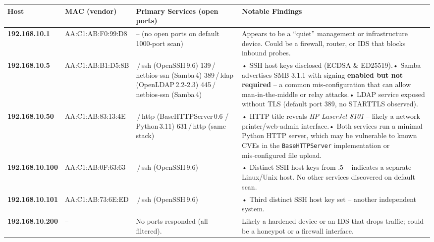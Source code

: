 \begin{longtable}[]{@{}
  >{\raggedright\arraybackslash}p{}
  >{\raggedright\arraybackslash}p{}
  >{\raggedright\arraybackslash}p{}
  >{\raggedright\arraybackslash}p{}@{}}
\toprule\noalign{}
\begin{minipage}[b]{\linewidth}\raggedright
Host
\end{minipage} & \begin{minipage}[b]{\linewidth}\raggedright
MAC (vendor)
\end{minipage} & \begin{minipage}[b]{\linewidth}\raggedright
Primary Services (open ports)
\end{minipage} & \begin{minipage}[b]{\linewidth}\raggedright
Notable Findings
\end{minipage} \\
\midrule\noalign{}
\endhead
\bottomrule\noalign{}
\endlastfoot
\textbf{192.168.10.1} & AA:C1:AB:F0:99:D8 & -- (no open ports on default
1000‑port scan) & Appears to be a ``quiet'' management or infrastructure
device. Could be a firewall, router, or IDS that blocks inbound
probes. \\
\textbf{192.168.10.5} & AA:C1:AB:B1:D5:8B & 22\,/\,ssh (OpenSSH\,9.6)
139\,/\,netbios‑ssn (Samba\,4) 389\,/\,ldap (OpenLDAP\,2.2‑2.3)
445\,/\,netbios‑ssn (Samba\,4) & • SSH host keys disclosed (ECDSA \&
ED25519).• Samba advertises SMB 3.1.1 with signing \textbf{enabled but
not required} -- a common mis‑configuration that can allow
man‑in‑the‑middle or relay attacks.• LDAP service exposed without TLS
(default port 389, no STARTTLS observed). \\
\textbf{192.168.10.50} & AA:C1:AB:83:13:4E & 80\,/\,http
(BaseHTTPServer\,0.6 / Python\,3.11) 631\,/\,http (same stack) & • HTTP
title reveals \emph{HP LaserJet 8101} -- likely a network
printer/web‑admin interface.• Both services run a minimal Python HTTP
server, which may be vulnerable to known CVEs in the
\texttt{BaseHTTPServer} implementation or mis‑configured file upload. \\
\textbf{192.168.10.100} & AA:C1:AB:0F:63:63 & 22\,/\,ssh (OpenSSH\,9.6)
& • Distinct SSH host keys from .5 -- indicates a separate Linux/Unix
host. No other services discovered on default scan. \\
\textbf{192.168.10.101} & AA:C1:AB:73:6E:ED & 22\,/\,ssh (OpenSSH\,9.6)
& • Third distinct SSH host key set -- another independent system. \\
\textbf{192.168.10.200} & -- & No ports responded (all filtered). &
Likely a hardened device or an IDS that drops traffic; could be a
honeypot or a firewall interface. \\
\end{longtable}

